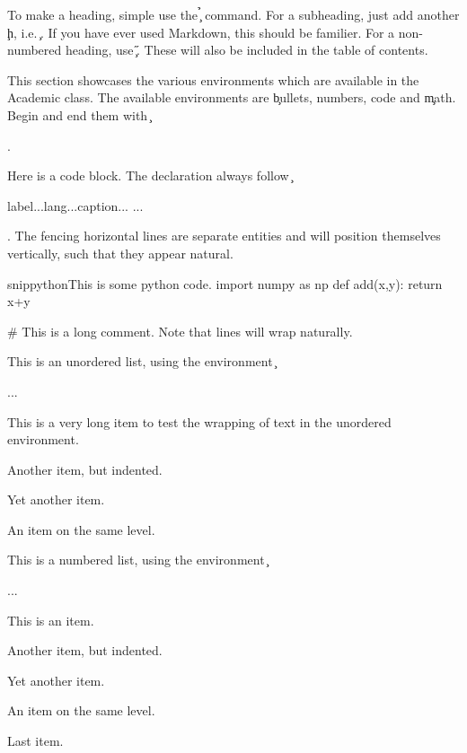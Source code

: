 \documentclass[onecolumn]{tome}
\begin{document}
To make a heading, simple use the \c{\h} command. For a subheading, just add another \c{h}, i.e. \c{\hh}. If you have ever used Markdown, this should be familier. For a non-numbered heading, use \c{\H}. These will also be included in the table of contents.

This section showcases the various environments which are available in the Academic class. The available environments are \c{bullets, numbers, code} and \c{math}. Begin and end them with \c{\begin{}} and \c{\end{}}.

Here is a code block. The declaration always follow \c{\begin{code}{label...}{lang...}{caption...} ... \end{code}}. The fencing horizontal lines are separate entities and will position themselves vertically, such that they appear natural.

\begin{code}{snip}{python}{This is some python code.}
import numpy as np
def add(x,y):
    return x+y

# This is a long comment. Note that lines will wrap naturally.
\end{code}

This is an unordered list, using the environment \c{\begin{bullets}...\end{bullets}}
\begin{bullets}
    \item This is a very long item to test the wrapping of text in the unordered environment.
    \begin{bullets}
        \item Another item, but indented.
        \begin{bullets}
            \item Yet another item.
            \item An item on the same level.
        \end{bullets}
    \end{bullets}
\end{bullets}

This is a numbered list, using the environment \c{\begin{numbers}...\end{numbers}}
\begin{numbers}
    \item This is an item.
    \begin{numbers}
        \item Another item, but indented.
        \begin{numbers}
            \item Yet another item.
            \item An item on the same level.
        \end{numbers}
    \end{numbers}
    \item Last item.
\end{numbers}
\end{document}
